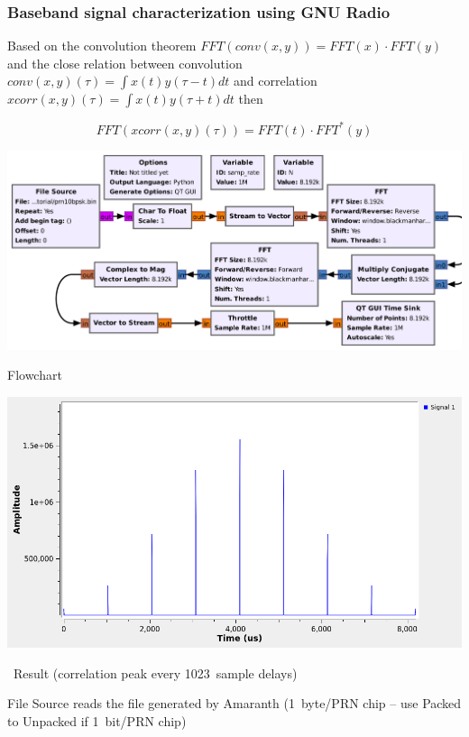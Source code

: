 \documentclass[compress,10pt,aspectratio=169]{beamer}
\begin{document}
\begin{frame}\frametitle{Baseband signal characterization using GNU Radio}

\parbox{1.051\linewidth}{
Based on the convolution theorem $FFT(conv(x,y))=FFT(x)\cdot FFT(y)$ and
the close relation between convolution $conv(x,y)(\tau)=\int x(t)y(\tau-t)dt$ 
and correlation $xcorr(x,y)(\tau)=\int x(t)y(\tau+t)dt$ then
}
$$FFT(xcorr(x,y)(\tau))=FFT(t)\cdot FFT^*(y)$$

\vfill
\begin{minipage}[t]{1.1\linewidth}
\begin{minipage}{.49\linewidth}
\includegraphics[width=\linewidth]{amaranth_PRNcorrelation.pdf}

Flowchart
\end{minipage}
\begin{minipage}{.49\linewidth}
\includegraphics[width=\linewidth]{amaranth_PRNcorrelation_output.png}

~\hfill Result (correlation peak every 1023~sample delays)~~~~~
\end{minipage}
\end{minipage}

\vspace{0.2cm}
File Source reads the file generated by Amaranth (1~byte/PRN chip -- use Packed
to Unpacked if 1~bit/PRN chip)
\end{frame}
\end{document}
